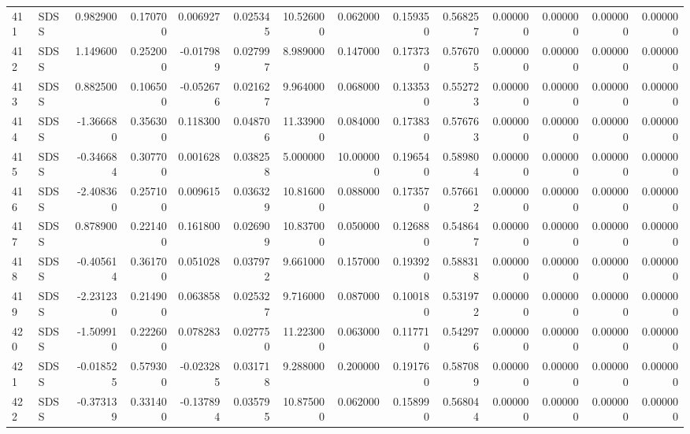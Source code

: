 \begin{tabular}{llrrrrrrrrrrrr}
411 &   SDSS &  0.982900 &      0.170700 &  0.006927 &    0.025345 &  10.526000 &      0.062000 &   0.159350 &  0.568257 &  0.000000 &   0.000000 &     0.000000 &     0.000000 \\
412 &   SDSS &  1.149600 &      0.252000 & -0.017989 &    0.027997 &   8.989000 &      0.147000 &   0.173730 &  0.576705 &  0.000000 &   0.000000 &     0.000000 &     0.000000 \\
413 &   SDSS &  0.882500 &      0.106500 & -0.052676 &    0.021627 &   9.964000 &      0.068000 &   0.133530 &  0.552723 &  0.000000 &   0.000000 &     0.000000 &     0.000000 \\
414 &   SDSS & -1.366680 &      0.356300 &  0.118300 &    0.048706 &  11.339000 &      0.084000 &   0.173830 &  0.576763 &  0.000000 &   0.000000 &     0.000000 &     0.000000 \\
415 &   SDSS & -0.346684 &      0.307700 &  0.001628 &    0.038258 &   5.000000 &     10.000000 &   0.196540 &  0.589804 &  0.000000 &   0.000000 &     0.000000 &     0.000000 \\
416 &   SDSS & -2.408360 &      0.257100 &  0.009615 &    0.036329 &  10.816000 &      0.088000 &   0.173570 &  0.576612 &  0.000000 &   0.000000 &     0.000000 &     0.000000 \\
417 &   SDSS &  0.878900 &      0.221400 &  0.161800 &    0.026909 &  10.837000 &      0.050000 &   0.126880 &  0.548647 &  0.000000 &   0.000000 &     0.000000 &     0.000000 \\
418 &   SDSS & -0.405614 &      0.361700 &  0.051028 &    0.037972 &   9.661000 &      0.157000 &   0.193920 &  0.588318 &  0.000000 &   0.000000 &     0.000000 &     0.000000 \\
419 &   SDSS & -2.231230 &      0.214900 &  0.063858 &    0.025327 &   9.716000 &      0.087000 &   0.100180 &  0.531972 &  0.000000 &   0.000000 &     0.000000 &     0.000000 \\
420 &   SDSS & -1.509910 &      0.222600 &  0.078283 &    0.027750 &  11.223000 &      0.063000 &   0.117710 &  0.542976 &  0.000000 &   0.000000 &     0.000000 &     0.000000 \\
421 &   SDSS & -0.018525 &      0.579300 & -0.023285 &    0.031718 &   9.288000 &      0.200000 &   0.191760 &  0.587089 &  0.000000 &   0.000000 &     0.000000 &     0.000000 \\
422 &   SDSS & -0.373139 &      0.331400 & -0.137894 &    0.035795 &  10.875000 &      0.062000 &   0.158990 &  0.568044 &  0.000000 &   0.000000 &     0.000000 &     0.000000 \\

\end{tabular}
